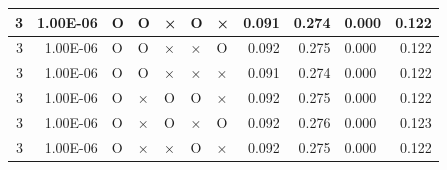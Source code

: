\documentclass[11pt]{article}
\begin{document}
\begin{longtable}[h]{|r|r|l|l|l|l|l|r|r|l|r|}
3                                 & 1.00E-06                         & O                                & O                                & ×                                & O                                & ×                                 & 0.091                             & 0.274                             & 0.000                              & 0.122                               \\ \hline
3                                 & 1.00E-06                         & O                                & O                                & ×                                & ×                                & O                                 & 0.092                             & 0.275                             & 0.000                              & 0.122                               \\ \hline
3                                 & 1.00E-06                         & O                                & O                                & ×                                & ×                                & ×                                 & 0.091                             & 0.274                             & 0.000                              & 0.122                               \\ \hline
3                                 & 1.00E-06                         & O                                & ×                                & O                                & O                                & ×                                 & 0.092                             & 0.275                             & 0.000                              & 0.122                               \\ \hline
3                                 & 1.00E-06                         & O                                & ×                                & O                                & ×                                & O                                 & 0.092                             & 0.276                             & 0.000                              & 0.123                               \\ \hline
3                                 & 1.00E-06                         & O                                & ×                                & ×                                & O                                & ×                                 & 0.092                             & 0.275                             & 0.000                              & 0.122                               \\ \hline

\end{longtable}
\end{document}
